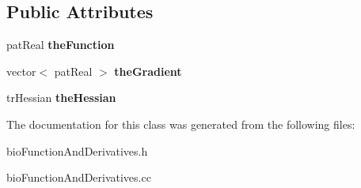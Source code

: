 \subsection*{Public Attributes}
\begin{DoxyCompactItemize}
\item 
\mbox{\label{classbio_function_and_derivatives_a00ee8264b73ca41b0c1f0781fd248758}} 
pat\+Real {\bfseries the\+Function}
\item 
\mbox{\label{classbio_function_and_derivatives_a2d245d10d3c907f262a9ebbcdb2686ee}} 
vector$<$ pat\+Real $>$ {\bfseries the\+Gradient}
\item 
\mbox{\label{classbio_function_and_derivatives_a49a875670ebfc68780e9b9516a52ae23}} 
tr\+Hessian {\bfseries the\+Hessian}
\end{DoxyCompactItemize}


The documentation for this class was generated from the following files\+:\begin{DoxyCompactItemize}
\item 
bio\+Function\+And\+Derivatives.\+h\item 
bio\+Function\+And\+Derivatives.\+cc\end{DoxyCompactItemize}
